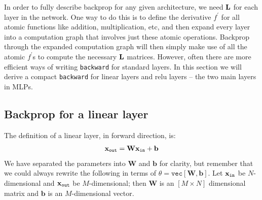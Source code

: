 In order to fully describe backprop for any given architecture, we need $\mathbf{L}$ for each layer in the network. One way to do this is to define the derivative $f^{\prime}$ for all atomic functions like addition, multiplication, etc, and then expand every layer into a computation graph that involves just these atomic operations. Backprop through the expanded computation graph will then simply make use of all the atomic $f^{\prime}$s to compute the necessary $\mathbf{L}$ matrices. However, often there are more efficient ways of writing \texttt{backward} for standard layers. In this section we will derive a compact \texttt{backward} for linear layers and relu layers -- the two main layers in MLPs.

\subsection{Backprop for a linear layer}

The definition of a linear layer, in forward direction, is:
\begin{align}
    \mathbf{x}_{\texttt{out}} = \mathbf{W} \mathbf{x}_{\texttt{in}} + \mathbf{b}
\end{align}
We have separated the parameters into $\mathbf{W}$ and $\mathbf{b}$ for clarity, but remember that we could always rewrite the following in terms of $\theta = \texttt{vec}[\mathbf{W}, \mathbf{b}]$. Let $\mathbf{x}_{\texttt{in}}$ be $N$-dimensional and $\mathbf{x}_{\texttt{out}}$ be $M$-dimensional; then $\mathbf{W}$ is an $[M \times N]$ dimensional matrix and $\mathbf{b}$ is an $M$-dimensional vector.

